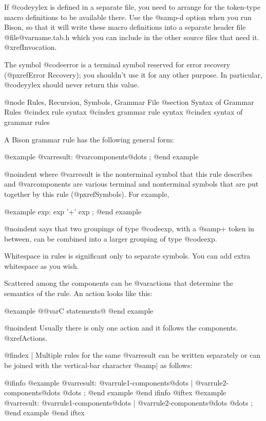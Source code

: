 {{{{{{{{{{{{{{{{{{If @code{yylex} is defined in a separate file, you need to arrange for the
token-type macro definitions to be available there.  Use the @samp{-d}
option when you run Bison, so that it will write these macro definitions
into a separate header file @file{@var{name}.tab.h} which you can include
in the other source files that need it.  @xref{Invocation}.

The symbol @code{error} is a terminal symbol reserved for error recovery
(@pxref{Error Recovery}); you shouldn't use it for any other purpose.
In particular, @code{yylex} should never return this value.

@node Rules, Recursion, Symbols, Grammar File
@section Syntax of Grammar Rules
@cindex rule syntax
@cindex grammar rule syntax
@cindex syntax of grammar rules

A Bison grammar rule has the following general form:

@example
@var{result}: @var{components}@dots{}
        ;
@end example

@noindent
where @var{result} is the nonterminal symbol that this rule describes
and @var{components} are various terminal and nonterminal symbols that
are put together by this rule (@pxref{Symbols}).  For example,

@example
exp:      exp '+' exp
        ;
@end example

@noindent
says that two groupings of type @code{exp}, with a @samp{+} token in between,
can be combined into a larger grouping of type @code{exp}.

Whitespace in rules is significant only to separate symbols.  You can add
extra whitespace as you wish.

Scattered among the components can be @var{actions} that determine
the semantics of the rule.  An action looks like this:

@example
@{@var{C statements}@}
@end example

@noindent
Usually there is only one action and it follows the components.
@xref{Actions}.

@findex |
Multiple rules for the same @var{result} can be written separately or can
be joined with the vertical-bar character @samp{|} as follows:

@ifinfo
@example
@var{result}:   @var{rule1-components}@dots{}
        | @var{rule2-components}@dots{}
        @dots{}
        ;
@end example
@end ifinfo
@iftex
@example
@var{result}:    @var{rule1-components}@dots{}
        | @var{rule2-components}@dots{}
        @dots{}
        ;
@end example
@end iftex

}}}}}}}}}}}}}}}}}}
